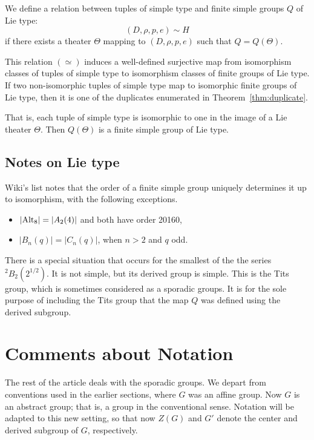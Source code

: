 We define a relation between tuples of simple type and finite simple
groups $Q$ of Lie type:
\[
(D,\rho,p,e)\sim H
\]
if there exists a theater $\Theta$ mapping to $(D,\rho,p,e)$ such that
$Q = Q(\Theta)$.

\begin{theorem}
  This relation $(\simeq)$ induces a well-defined surjective map
  from isomorphism classes of tuples of simple type
  to isomorphism classes of finite groups of Lie type.
  If two non-isomorphic tuples of simple type map to
  isomorphic finite groups of Lie type, then it is one
  of the duplicates enumerated in Theorem~\ref{thm:duplicate}.
\end{theorem}

That is, each tuple of simple type is isomorphic to one in the
image of a Lie theater $\Theta$.  Then $Q(\Theta)$ is a finite simple
group of Lie type.




\subsection{Notes on Lie type}

Wiki's list \cite{Wiki} notes that the order of a finite simple group
uniquely determines it up to isomorphism, with the following exceptions.
\begin{itemize}
\item $|\text{Alt}_8|= |A_2(4)|$ and both have order 20160,
\item $|B_n(q)|=|C_n(q)|$, when $n>2$ and $q$ odd.
\end{itemize}

There is a special situation that occurs for the smallest of the
the series ${}^2B_2(2^{1/2})$.  It is not simple, but its derived
group is simple.  This is the Tits group, which is sometimes
considered as a sporadic groups.  It is for the
sole purpose of including the Tits group that the map $Q$
was defined using the derived subgroup.

\section{Comments about Notation}

The rest of the article deals with the sporadic groups.  We depart
from conventions used in the earlier sections, where $G$ was an affine
group.  Now $G$ is an abstract group; that is, a group in the
conventional sense.  Notation will be adapted to this new setting, so
that now $Z(G)$ and $G'$ denote the center and derived subgroup of
$G$, respectively.

